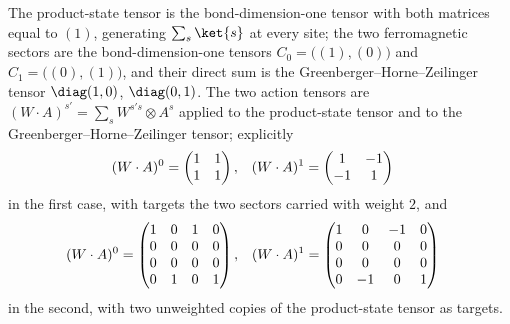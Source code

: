 \begin{definition}
    \label{def:asymex_kw_action}
    \leanok
    The product-state tensor is the bond-dimension-one tensor with both
    matrices equal to $(1)$, generating $\sum_s\ket{s}$ at every site; the
    two ferromagnetic sectors are the bond-dimension-one tensors
    $C_0=\bigl((1),(0)\bigr)$ and $C_1=\bigl((0),(1)\bigr)$, and their direct
    sum is the Greenberger--Horne--Zeilinger tensor $\diag(1,0)$,
    $\diag(0,1)$.
    The two action tensors are
    $(W\cdot A)^{s'}=\sum_sW^{s's}\otimes A^s$ applied to the product-state
    tensor and to the Greenberger--Horne--Zeilinger tensor; explicitly
    \begin{align}
        (W\cdot A)^0
         & =\begin{pmatrix}1&1\\1&1\end{pmatrix},
         &
        (W\cdot A)^1
         & =\begin{pmatrix}1&-1\\-1&1\end{pmatrix}
        \notag
    \end{align}
    in the first case, with targets the two sectors carried with weight $2$,
    and
    \begin{align}
        (W\cdot A)^0
         & =\begin{pmatrix}
                1 & 0 & 1 & 0 \\
                0 & 0 & 0 & 0 \\
                0 & 0 & 0 & 0 \\
                0 & 1 & 0 & 1
            \end{pmatrix},
         &
        (W\cdot A)^1
         & =\begin{pmatrix}
                1 & 0  & -1 & 0 \\
                0 & 0  & 0  & 0 \\
                0 & 0  & 0  & 0 \\
                0 & -1 & 0  & 1
            \end{pmatrix}
        \notag
    \end{align}
    in the second, with two unweighted copies of the product-state tensor as
    targets.
\end{definition}

